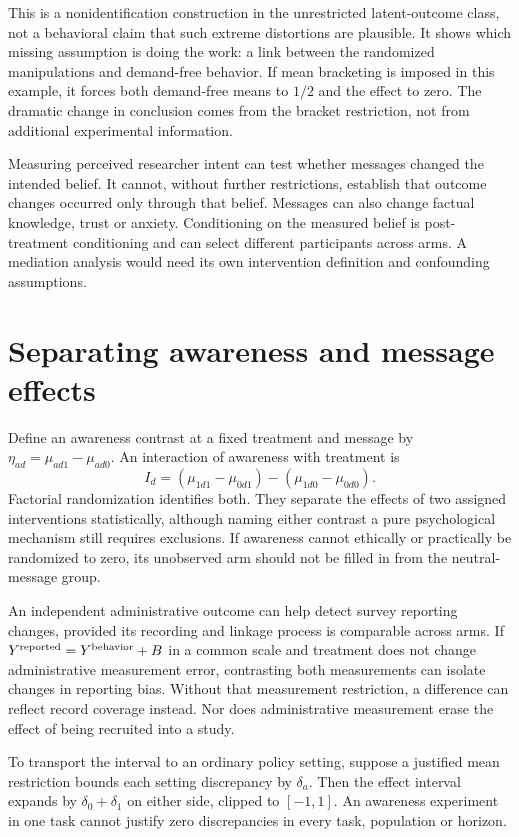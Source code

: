 \documentclass[11pt]{article}
\begin{document}
This is a nonidentification construction in the unrestricted latent-outcome class, not a behavioral claim that such extreme distortions are plausible. It shows which missing assumption is doing the work: a link between the randomized manipulations and demand-free behavior. If mean bracketing is imposed in this example, it forces both demand-free means to $1/2$ and the effect to zero. The dramatic change in conclusion comes from the bracket restriction, not from additional experimental information.

Measuring perceived researcher intent can test whether messages changed the intended belief. It cannot, without further restrictions, establish that outcome changes occurred only through that belief. Messages can also change factual knowledge, trust or anxiety. Conditioning on the measured belief is post-treatment conditioning and can select different participants across arms. A mediation analysis would need its own intervention definition and confounding assumptions.

\section{Separating awareness and message effects}
Define an awareness contrast at a fixed treatment and message by
$\eta_{ad}=\mu_{ad1}-\mu_{ad0}$. An interaction of awareness with treatment is
\[
 I_d=(\mu_{1d1}-\mu_{0d1})-(\mu_{1d0}-\mu_{0d0}).
\]
Factorial randomization identifies both. They separate the effects of two assigned interventions statistically, although naming either contrast a pure psychological mechanism still requires exclusions. If awareness cannot ethically or practically be randomized to zero, its unobserved arm should not be filled in from the neutral-message group.

An independent administrative outcome can help detect survey reporting changes, provided its recording and linkage process is comparable across arms. If $Y^{\rm reported}=Y^{\rm behavior}+B$ in a common scale and treatment does not change administrative measurement error, contrasting both measurements can isolate changes in reporting bias. Without that measurement restriction, a difference can reflect record coverage instead. Nor does administrative measurement erase the effect of being recruited into a study.

To transport the interval to an ordinary policy setting, suppose a justified mean restriction bounds each setting discrepancy by $\delta_a$. Then the effect interval expands by $\delta_0+\delta_1$ on either side, clipped to $[-1,1]$. An awareness experiment in one task cannot justify zero discrepancies in every task, population or horizon.
\end{document}
